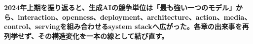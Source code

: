 \noindent\textbf{2024年上期を振り返ると、生成AIの競争単位は「最も強い一つのモデル」から、interaction、openness、deployment、architecture、action、media、control、servingを組み合わせるsystem stackへ広がった。各章の出来事を再列挙せず、その構造変化を一本の線として結び直す。}\autocite{src-054d1f81750b,src-0fe343211040,src-2d3a533e91db,src-4ff5ab7d45bc,src-77e35e5f22be,src-b5fbfc0d43e4,src-c89d38f0e830,src-f9616f30e8f5}
